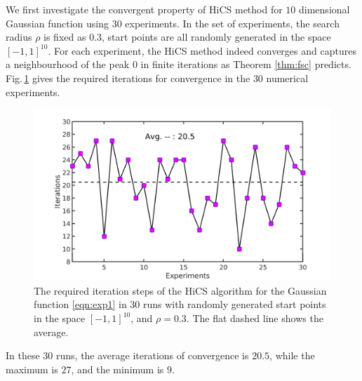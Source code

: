 
We first investigate the convergent property of HiCS
method for $10$ dimensional Gaussian function using 
$30$ experiments.
In the set of experiments, the search radius $\rho$ is fixed as
$0.3$, start points are all randomly generated in the space $[-1,
1]^{10}$.  For each experiment, the HiCS method indeed converges and
captures a neighbourhood of the peak
$0$ in finite iterations as Theorem \ref{thm:fsc} predicts.
Fig.\,\ref{fig:exp1:randInit} gives the required iterations for
convergence in the $30$ numerical experiments.
\begin{figure}[!htbp]
	\centering
	  \includegraphics[scale=0.2]{../figures/gauss10Drandr0_3.png}
	  \caption{
	  The required iteration steps of the 
	  HiCS algorithm for the Gaussian function
	  \eqref{eqn:exp1} in $30$ runs with randomly generated start points
	  in the space $[-1, 1]^{10}$, and $\rho=0.3$. 
	  The flat dashed line shows the average.} 
	  \label{fig:exp1:randInit}
\end{figure}
In these $30$ runs, the average iterations of convergence is
$20.5$, while the maximum is $27$, and the minimum is $9$.


